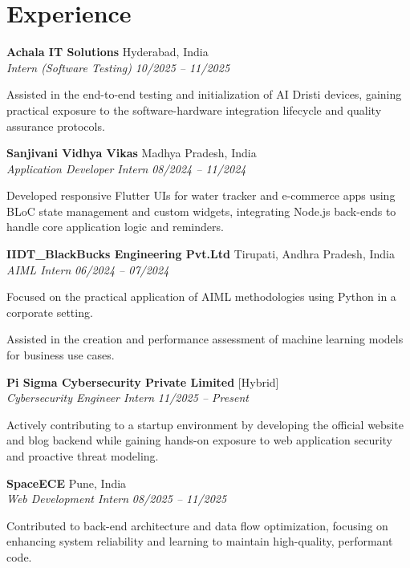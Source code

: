 \section{Experience}

\textbf{Achala IT Solutions} \hfill Hyderabad, India \\
\textit{Intern (Software Testing)} \hfill \textit{10/2025 -- 11/2025}
\begin{highlights}
\item Assisted in the end-to-end testing and initialization of AI Dristi devices, gaining practical exposure to the software-hardware integration lifecycle and quality assurance protocols.
\end{highlights}

\textbf{Sanjivani Vidhya Vikas} \hfill Madhya Pradesh, India \\
\textit{Application Developer Intern} \hfill \textit{08/2024 -- 11/2024}
\begin{highlights}
\item Developed responsive Flutter UIs for water tracker and e-commerce apps using BLoC state management and custom widgets, integrating Node.js back-ends to handle core application logic and reminders.
\end{highlights}

\textbf{IIDT\_BlackBucks Engineering Pvt.Ltd} \hfill Tirupati, Andhra Pradesh, India \\
\textit{AIML Intern} \hfill \textit{06/2024 -- 07/2024}
\begin{highlights}
    \item Focused on the practical application of AIML methodologies using Python in a corporate setting.
    \item Assisted in the creation and performance assessment of machine learning models for business use cases.
\end{highlights}

\textbf{Pi Sigma Cybersecurity Private Limited} \hfill [Hybrid] \\
\textit{Cybersecurity Engineer Intern} \hfill \textit{11/2025 -- Present}
\begin{highlights}
\item Actively contributing to a startup environment by developing the official website and blog backend while gaining hands-on exposure to web application security and proactive threat modeling.
\end{highlights}

\textbf{SpaceECE} \hfill Pune, India \\
\textit{Web Development Intern} \hfill \textit{08/2025 -- 11/2025}
\begin{highlights}
    \item Contributed to back-end architecture and data flow optimization, focusing on enhancing system reliability and learning to maintain high-quality, performant code.
\end{highlights}